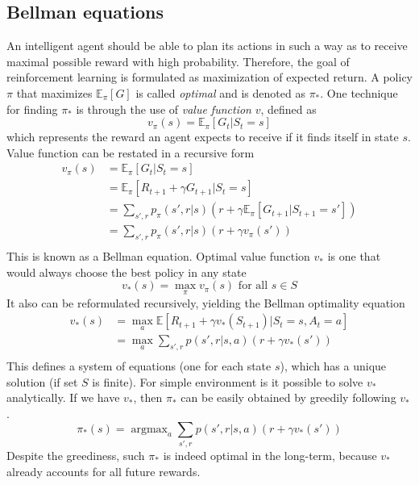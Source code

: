 \documentclass[oneside,english,logo]{amuthesis}
\DeclareMathOperator*{\argmax}{argmax}
\begin{document}
\subsection{Bellman equations}
An intelligent agent should be able to plan its actions in such a way as to receive maximal possible reward with high probability. Therefore, the goal of reinforcement learning is formulated as maximization of expected return. A policy $\pi$ that maximizes $\mathbb{E}_\pi [G]$ is called \textit{optimal} and is denoted as $\pi_*$. One technique for finding $\pi_*$ is through the use of \textit{value function} $v$, defined as 
\[
v_\pi(s) = \mathbb{E}_\pi [G_t|S_t=s]
\]
which represents the reward an agent expects to receive if it finds itself in state $s$. Value function can be restated in a recursive form
\begin{equation}
	\begin{split}
		v_\pi(s) & = \mathbb{E}_\pi [G_t|S_t=s] \\
		& = \mathbb{E}_\pi [R_{t+1}+\gamma G_{t+1}|S_t=s] \\
		& = \sum_{s',r} p_\pi(s',r|s)(r+\gamma \mathbb{E}_\pi [G_{t+1}|S_{t+1}=s']) \\
		& = \sum_{s',r} p_\pi(s',r|s)(r+\gamma v_\pi(s')) \\
	\end{split}
\end{equation}
This is known as a Bellman equation. 
Optimal value function $v_*$ is one that would always choose the best policy in any state
\[
v_*(s) = \max_\pi v_\pi(s)\text{ for all }s\in S
\]
It also can be reformulated recursively, yielding the Bellman optimality equation
\begin{equation}
	\begin{split}
v_*(s) & = \max_a \mathbb{E}[R_{t+1}+\gamma v_*(S_{t+1})|S_t=s,A_t=a] \\
		& = \max_a  \sum_{s',r} p(s',r|s,a)(r+\gamma v_*(s')) \\
	\end{split}
\end{equation}
This defines a system of equations (one for each state $s$), which has a unique solution (if set $S$ is finite). For simple environment is it possible to solve $v_*$ analytically. If we have $v_*$, then $\pi_*$  can be easily obtained by greedily following $v_*$.
\[
\pi_*(s) = \argmax_a \sum_{s',r} p(s',r|s,a)(r+\gamma v_*(s')) 
\]
Despite the greediness, such $\pi_*$ is indeed  optimal in the long-term, because $v_*$ already accounts for all future rewards.
\end{document}
